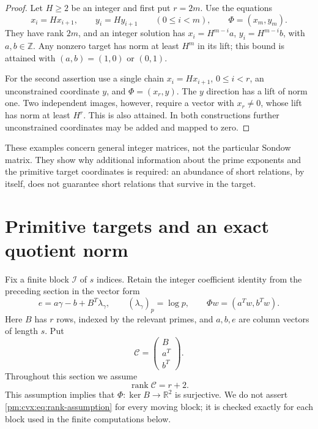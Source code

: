 \documentclass[11pt,a4paper]{article}
\newcommand{\R}{\mathbb R}
\DeclareMathOperator{\rank}{rank}
\theoremstyle{definition}
\theoremstyle{remark}
\numberwithin{equation}{section}
\begin{document}
\begin{proof}
Let $H\geq2$ be an integer and first put $r=2m$.  Use the equations
\[
 x_i=Hx_{i+1},\qquad y_i=Hy_{i+1}\qquad(0\leq i<m),
 \qquad \Phi=(x_m,y_m).
\]
They have rank $2m$, and an integer solution has
$x_i=H^{m-i}a$, $y_i=H^{m-i}b$, with $a,b\in\mathbb Z$.
Any nonzero target has norm at least $H^m$ in its lift; this bound
is attained with $(a,b)=(1,0)$ or $(0,1)$.

For the second assertion use a single chain
$x_i=Hx_{i+1}$, $0\leq i<r$, an unconstrained coordinate $y$,
and $\Phi=(x_r,y)$.  The $y$ direction has a lift of norm one.
Two independent images, however, require a vector with $x_r\ne0$,
whose lift has norm at least $H^r$.  This is also attained.
In both constructions further unconstrained coordinates may be
added and mapped to zero.
\end{proof}

These examples concern general integer matrices, not the particular
Sondow matrix.  They show why additional information about the prime
exponents and the primitive target coordinates is required: an
abundance of short relations, by itself, does not guarantee short
relations that survive in the target.


\section{Primitive targets and an exact quotient norm}
\label{pm:cvx:sec:quotient}

Fix a finite block $\mathcal I$ of $s$ indices.  Retain the integer
coefficient identity from the preceding section in the vector form
\begin{equation}\label{pm:cvx:eq:vector-identity}
 e=a\gamma-b+B^T\lambda_\gamma,
 \qquad (\lambda_\gamma)_p=\log p,
 \qquad \Phi w=(a^Tw,b^Tw).
\end{equation}
Here $B$ has $r$ rows, indexed by the relevant primes, and $a,b,e$ are
column vectors of length $s$.  Put
\[
 \mathcal C=\begin{pmatrix}B\\a^T\\b^T\end{pmatrix}.
\]
Throughout this section we assume
\begin{equation}\label{pm:cvx:eq:rank-assumption}
 \rank\mathcal C=r+2.
\end{equation}
This assumption implies that
$\Phi:\ker B\longrightarrow\R^2$ is surjective.  We do not assert
\eqref{pm:cvx:eq:rank-assumption} for every moving block; it is checked
exactly for each block used in the finite computations below.
\end{document}
